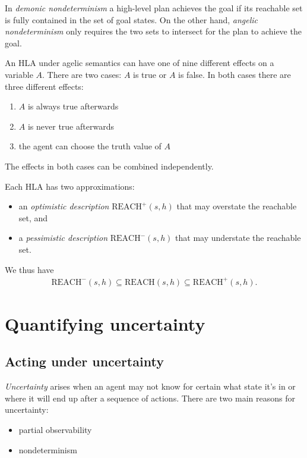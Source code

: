 \documentclass{article}
\begin{document}
\begin{definition}
    In \emph{demonic nondeterminism} a high-level plan achieves the goal if
    its reachable set is fully contained in the set of goal states.
    On the other hand, \emph{angelic nondeterminism} only requires the two
    sets to intersect for the plan to achieve the goal.
\end{definition}

\begin{theorem}
    An HLA under agelic semantics can have one of nine different effects on
    a variable $A$. There are two cases: $A$ is true or $A$ is false. In both
    cases there are three different effects:
    \begin{enumerate}
        \item $A$ is always true afterwards
        \item $A$ is never true afterwards
        \item the agent can choose the truth value of $A$
    \end{enumerate}
    The effects in both cases can be combined independently.
\end{theorem}

\begin{definition}
    Each HLA has two approximations:
    \begin{itemize}
        \item an \emph{optimistic description} $\text{REACH}^+(s,h)$ that may
              overstate the reachable set, and
        \item a \emph{pessimistic description} $\text{REACH}^-(s,h)$ that may
              understate the reachable set.
    \end{itemize}
    We thus have
    \begin{align*}
        \text{REACH}^-(s,h) \subseteq\text{REACH}(s,h)\subseteq\text{REACH}^+(s,h).
    \end{align*}
\end{definition}


\section{Quantifying uncertainty}


\subsection{Acting under uncertainty}

\begin{definition}
    \emph{Uncertainty} arises when an agent may not know for certain what state
    it's in or where it will end up after a sequence of actions. There are
    two main reasons for uncertainty:
    \begin{itemize}
        \item partial observability
        \item nondeterminism
    \end{itemize}
\end{definition}
\end{document}
